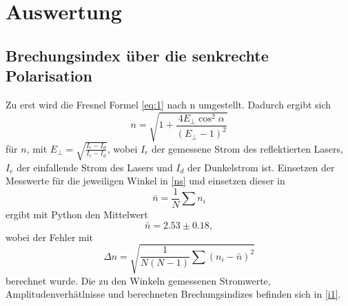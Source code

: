 \section{Auswertung}
\label{sec:Auswertung}

\subsection{Brechungsindex über die senkrechte Polarisation}
Zu erst wird die Fresnel Formel \eqref{eq:1} nach n umgestellt. Dadurch ergibt sich 
\begin{equation}
  n=\sqrt{1+\frac{4E_{\bot}\cos^2{\alpha}}{(E_{\bot}-1)^2}}
  \label{ns}
\end{equation}
für $n$, mit $E_{\bot}=\sqrt{\frac{I_r-I_d}{I_e-I_d}}$, wobei $I_r$ der gemessene Strom des reflektierten Lasers, $I_e$ der einfallende Strom des Lasers und $I_d$ der Dunkelstrom ist. Einsetzen der Messwerte für die jeweiligen Winkel in \eqref{ns} und einsetzen dieser in
\begin{equation}
  \bar n=\frac{1}{N}\sum n_i
  \label{m}
\end{equation}
ergibt mit Python den Mittelwert 
\begin{equation*}
  \bar n=2.53 \pm 0.18,
\end{equation*}
wobei der Fehler mit
\begin{equation}
  \Delta n=\sqrt{\frac{1}{N(N-1)}\sum (n_i-\bar n)^2}
  \label{f}
\end{equation}
berechnet wurde. Die zu den Winkeln gemessenen Stromwerte, Amplitudenverhätlnisse und berechneten Brechungsindizes befinden sich in \autoref{i1}. 
